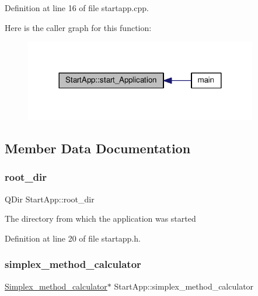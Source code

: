 Definition at line 16 of file startapp.\+cpp.

Here is the caller graph for this function\+:\nopagebreak
\begin{figure}[H]
\begin{center}
\leavevmode
\includegraphics[width=288pt]{classStartApp_ac70f07e04b8f7766858ce67d75c3b636_icgraph}
\end{center}
\end{figure}


\subsection{Member Data Documentation}
\mbox{\label{classStartApp_aec43484cd57a1722eb328aef4f86f719}} 
\subsubsection{\texorpdfstring{root\+\_\+dir}{root\_dir}}
{\footnotesize\ttfamily Q\+Dir Start\+App\+::root\+\_\+dir\hspace{0.3cm}{\ttfamily [private]}}

The directory from which the application was started 

Definition at line 20 of file startapp.\+h.

\mbox{\label{classStartApp_aa3f067219fde69ecd40738af7b179780}} 
\subsubsection{\texorpdfstring{simplex\+\_\+method\+\_\+calculator}{simplex\_method\_calculator}}
{\footnotesize\ttfamily \hyperlink{classSimplex__method__calculator}{Simplex\+\_\+method\+\_\+calculator}$\ast$ Start\+App\+::simplex\+\_\+method\+\_\+calculator\hspace{0.3cm}{\ttfamily [private]}}

